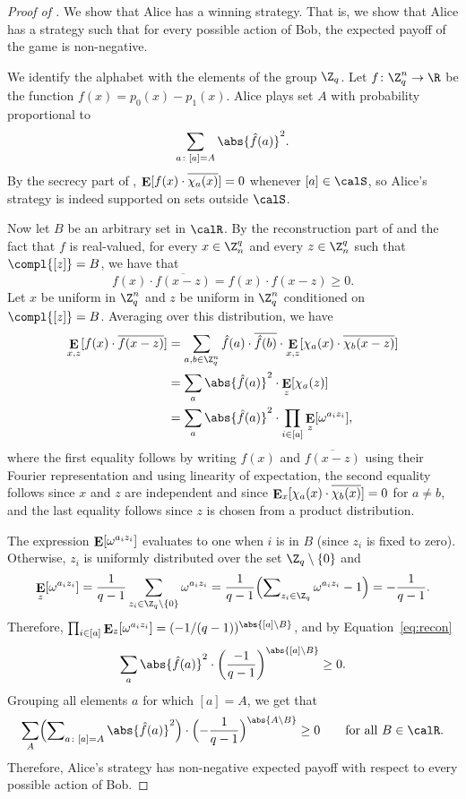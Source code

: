 \documentclass{toc}
\DeclareMathOperator\E{\mathop{\bf E}}
\begin{document}
\begin{proof}[Proof of ]
	We show that Alice has a winning strategy. That is, we show that Alice has a strategy such that for
	every possible action of Bob, the expected payoff of the game is non-negative.  
	
	We identify the alphabet with the elements of the group $\Z_q$. Let $f\colon \Z_q^n \to \R$ be the function $f(x) = p_0(x) - p_1(x)$.  Alice plays set $A$ with probability proportional to
        \[
          \sum_{a\colon [a] = A} \abs{\hat{f}(a)}^2.
        \]
        By the secrecy part of ,
        $\E[f(x) \cdot\overline{\chi_a(x)}] = 0$ whenever
        $[a] \in \calS$, so Alice's strategy is indeed supported on
        sets outside $\calS$.
	
	Now let $B$ be an arbitrary set in $\calR$.  By the reconstruction part of
	 and the fact that $f$ is real-valued, for every
	$x\in\Z_n^q$ and every $z\in\Z_n^q$ such that $\compl{[z]} = B$, we have that
	\begin{equation}
	\label{eq:recon}
	f(x) \cdot \overline{f(x - z)} = f(x) \cdot f(x - z) \geq 0.
	\end{equation}
	Let $x$ be uniform in $\Z_q^n$ and $z$ be uniform in $\Z_q^n$ conditioned on $\compl{[z]} = B$.  Averaging over this distribution, we have
	\begin{align*}
	\E_{x,z}[f(x) \cdot \overline{f(x - z)}] 
	&= \sum_{a, b\in\Z_q^n} \hat{f}(a) \cdot \overline{\hat{f}(b)} \cdot\E_{x, z}[\chi_a(x)
	\cdot \overline{\chi_b(x - z)}] \\
	&= \sum_a \abs{\hat{f}(a)}^2 \cdot \E_z[\chi_a(z)] \\
	&= \sum_a \abs{\hat{f}(a)}^2 \cdot \prod_{i \in [a]} \E_z[\omega^{a_iz_i}],
	\end{align*}
	where the first equality follows by writing $f(x)$ and $\overline{f(x-z)}$ using
	their Fourier representation and using linearity of expectation, the second
	equality follows since $x$ and $z$ are independent and since $\E_{x}[\chi_a(x)
	\cdot \overline{\chi_b(x)}] = 0$ for $a\neq b$, and the last equality follows
	since $z$ is chosen from a product distribution.
	
	The expression $\E[\omega^{a_iz_i}]$ evaluates to one when $i$ is in $B$ (since
	$z_i$ is fixed to zero).  Otherwise, $z_i$ is uniformly distributed over the set
	$\Z_q \setminus \{0\}$ and
	\[ \E_z[\omega^{a_iz_i}] = \frac{1}{q - 1} \sum_{z_i \in \Z_q \setminus \{0\}} \omega^{a_iz_i} = 
	\frac{1}{q - 1}\Bigl(\sum\nolimits_{z_i \in \Z_q} \omega^{a_iz_i} - 1\Bigr) = -\frac{1}{q-1}. \]
	Therefore, $\prod_{i \in [a]} \E_z[\omega^{a_iz_i}] = (-1/(q-1))^{\abs{[a] \setminus B}}$, and by Equation~\eqref{eq:recon}
	\[\sum_a \abs{\hat{f}(a)}^2 \cdot \left(\frac{-1}{q-1}\right)^{\abs{[a] \setminus B}} \geq 0.\]
Grouping all elements $a$  for which $[a] = A$, we get that 
\[ \sum_A \Bigl(\sum\nolimits_{a\colon [a] = A} \abs{\hat{f}(a)}^2\Bigr) \cdot \Bigl(-\frac{1}{q-1} \Bigr)^{\abs{A \setminus B}} \geq 0 \qquad\text{for all $B \in \calR$.} \]
Therefore, Alice's strategy has non-negative expected payoff with respect to every possible action of Bob.
\end{proof}
\end{document}
